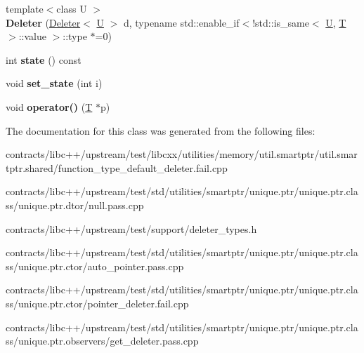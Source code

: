 \begin{DoxyCompactItemize}
\item 
\mbox{\label{struct_deleter_abba91bbdb128ee960b9e5b2db4a21776}} 
{\footnotesize template$<$class U $>$ }\\{\bfseries Deleter} (\mbox{\hyperlink{struct_deleter}{Deleter}}$<$ \mbox{\hyperlink{union_u}{U}} $>$ d, typename std\+::enable\+\_\+if$<$!std\+::is\+\_\+same$<$ \mbox{\hyperlink{union_u}{U}}, \mbox{\hyperlink{struct_t}{T}} $>$\+::value $>$\+::type $\ast$=0)
\item 
\mbox{\label{struct_deleter_aacdd533c4b685d1587b28156fa1512f9}} 
int {\bfseries state} () const
\item 
\mbox{\label{struct_deleter_a433e2e5fc886086624de694444f898ff}} 
void {\bfseries set\+\_\+state} (int i)
\item 
\mbox{\label{struct_deleter_a41b54e03f57e6c3e447550d3d4e4b312}} 
void {\bfseries operator()} (\mbox{\hyperlink{struct_t}{T}} $\ast$p)
\end{DoxyCompactItemize}


The documentation for this class was generated from the following files\+:\begin{DoxyCompactItemize}
\item 
contracts/libc++/upstream/test/libcxx/utilities/memory/util.\+smartptr/util.\+smartptr.\+shared/function\+\_\+type\+\_\+default\+\_\+deleter.\+fail.\+cpp\item 
contracts/libc++/upstream/test/std/utilities/smartptr/unique.\+ptr/unique.\+ptr.\+class/unique.\+ptr.\+dtor/null.\+pass.\+cpp\item 
contracts/libc++/upstream/test/support/deleter\+\_\+types.\+h\item 
contracts/libc++/upstream/test/std/utilities/smartptr/unique.\+ptr/unique.\+ptr.\+class/unique.\+ptr.\+ctor/auto\+\_\+pointer.\+pass.\+cpp\item 
contracts/libc++/upstream/test/std/utilities/smartptr/unique.\+ptr/unique.\+ptr.\+class/unique.\+ptr.\+ctor/pointer\+\_\+deleter.\+fail.\+cpp\item 
contracts/libc++/upstream/test/std/utilities/smartptr/unique.\+ptr/unique.\+ptr.\+class/unique.\+ptr.\+observers/get\+\_\+deleter.\+pass.\+cpp\end{DoxyCompactItemize}
